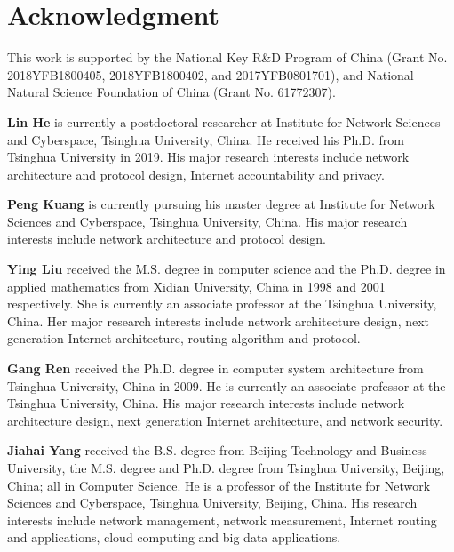 \documentclass[a4paper,fleqn]{cas-dc}
\begin{document}
\section*{Acknowledgment}
    This work is supported by the National Key R\&D Program of China (Grant No. 2018YFB1800405, 2018YFB1800402, and 2017YFB0801701), and National Natural Science Foundation of China (Grant No. 61772307).




%


% 



\bio{}
\textbf{Lin He} is currently a postdoctoral researcher at Institute for Network Sciences and Cyberspace, Tsinghua University, China. He received his Ph.D. from Tsinghua University in 2019. His major research interests include network architecture and protocol design, Internet accountability and privacy.
\endbio

\bio{}
\textbf{Peng Kuang} is currently pursuing his master degree at Institute for Network Sciences and Cyberspace, Tsinghua University, China. His major research interests include network architecture and protocol design.
\endbio

\bio{}
\textbf{Ying Liu} received the M.S. degree in computer science and the Ph.D. degree in applied mathematics from Xidian University, China in 1998 and 2001 respectively. She is currently an associate professor at the Tsinghua University, China. Her major research interests include network architecture design, next generation Internet architecture, routing algorithm and protocol.
\endbio

\bio{}
\textbf{Gang Ren} received the Ph.D. degree in computer system architecture from Tsinghua University, China in 2009. He is currently an associate professor at the Tsinghua University, China. His major research interests include network architecture design, next generation Internet architecture, and network security.
\endbio

\bio{}
\textbf{Jiahai Yang} received the B.S. degree from Beijing Technology and Business University, the M.S. degree and Ph.D. degree from Tsinghua University, Beijing, China; all in Computer Science. He is a professor of the Institute for Network Sciences and Cyberspace, Tsinghua University, Beijing, China. His research interests include network management, network measurement, Internet routing and applications, cloud computing and big data applications.
\endbio
\end{document}
